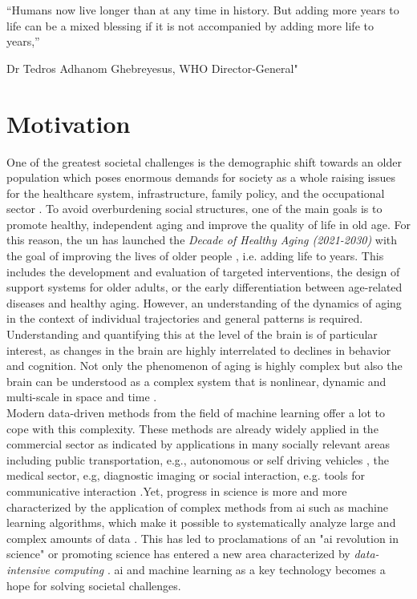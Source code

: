 \setlength{\epigraphwidth}{0.6\textwidth}
\epigraph{\centering “Humans now live longer than at any time in history. But adding more years to life can be a mixed blessing if it is not accompanied by adding more life to years,”} {Dr Tedros Adhanom Ghebreyesus, WHO Director-General"}

\section{Motivation}
One of the greatest societal challenges is the demographic shift towards an older population which poses enormous demands for society as a whole raising issues for the healthcare system, infrastructure, family policy, and the occupational sector \cite{who_aging2023}. To avoid overburdening social structures, one of the main goals is to promote healthy, independent aging and improve the quality of life in old age. For this reason, the \gls{un} has launched the \textit{Decade of Healthy Aging (2021-2030)} with the goal of improving the lives of older people \cite{who_decade_ha2020}, i.e. adding life to years. This includes the development and evaluation of targeted interventions, the design of support systems for older adults, or the early differentiation between age-related diseases and healthy aging. However, an understanding of the dynamics of aging in the context of individual trajectories and general patterns is required. Understanding and quantifying this at the level of the brain is of particular interest, as changes in the brain are highly interrelated to declines in behavior and cognition. Not only the phenomenon of aging is highly complex but also the brain can be understood as a complex system that is nonlinear, dynamic and multi-scale in space and time \cite{Betzel2017}.\\ 
Modern data-driven methods from the field of machine learning offer a lot to cope with this complexity. These methods are already widely applied in the commercial sector as indicated by applications in many socially relevant areas including public transportation, e.g., autonomous or self driving vehicles \cite{Leonard2020}, the medical sector, e.g, diagnostic imaging \cite{Liu2020} or social interaction, e.g. tools for communicative interaction \cite{Adamopoulou2020}.Yet, progress in science is more and more characterized by the application of complex methods from \gls{ai} such as machine learning algorithms, which make it possible to systematically analyze large and complex amounts of data \cite{Brunton2019}. This has led to proclamations of an "\gls{ai} revolution in science" \cite{Appenzeller2017} or promoting science has entered a new area characterized by \textit{data-intensive computing} \cite{Hey2009}. \Gls{ai} and machine learning as a key technology becomes a hope for solving societal challenges.\\ 

